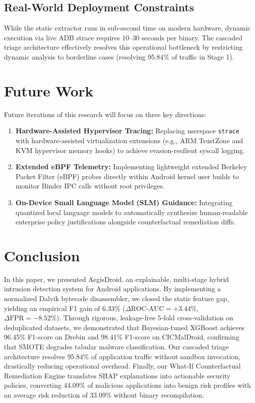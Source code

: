 \documentclass[10pt,journal,compsoc]{IEEEtran}
\begin{document}
\subsection{Real-World Deployment Constraints}
While the static extractor runs in sub-second time on modern hardware, dynamic execution via live ADB strace requires 10--30 seconds per binary. The cascaded triage architecture effectively resolves this operational bottleneck by restricting dynamic analysis to borderline cases (resolving 95.84\% of traffic in Stage 1).

\section{Future Work}
Future iterations of this research will focus on three key directions:
\begin{enumerate}
    \item \textbf{Hardware-Assisted Hypervisor Tracing:} Replacing userspace \texttt{strace} with hardware-assisted virtualization extensions (e.g., ARM TrustZone and KVM hypervisor memory hooks) to achieve evasion-resilient syscall logging.
    \item \textbf{Extended eBPF Telemetry:} Implementing lightweight extended Berkeley Packet Filter (eBPF) probes directly within Android kernel user builds to monitor Binder IPC calls without root privileges.
    \item \textbf{On-Device Small Language Model (SLM) Guidance:} Integrating quantized local language models to automatically synthesize human-readable enterprise policy justifications alongside counterfactual remediation diffs.
\end{enumerate}

\section{Conclusion}
In this paper, we presented AegisDroid, an explainable, multi-stage hybrid intrusion detection system for Android applications. By implementing a normalized Dalvik bytecode disassembler, we closed the static feature gap, yielding an empirical F1 gain of 6.33\% ($\Delta \text{ROC-AUC} = +3.44\%$, $\Delta \text{FPR} = -8.52\%$). Through rigorous, leakage-free 5-fold cross-validation on deduplicated datasets, we demonstrated that Bayesian-tuned XGBoost achieves 96.45\% F1-score on Drebin and 98.41\% F1-score on CICMalDroid, confirming that SMOTE degrades tabular malware classification. Our cascaded triage architecture resolves 95.84\% of application traffic without sandbox invocation, drastically reducing operational overhead. Finally, our What-If Counterfactual Remediation Engine translates SHAP explanations into actionable security policies, converting 44.09\% of malicious applications into benign risk profiles with an average risk reduction of 33.09\% without binary recompilation.
\end{document}

